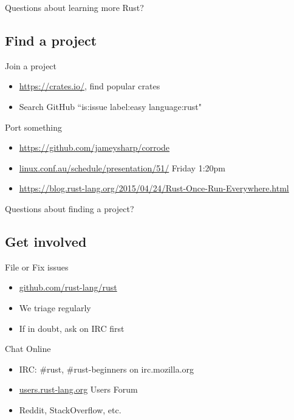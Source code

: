 \documentclass[aspectratio=169]{beamer}
\begin{document}
\begin{frame}
    \hfill Questions about learning more Rust?
\end{frame}


\subsection{Find a project}

\begin{frame}
    Join a project
    \begin{itemize}
        \item \url{https://crates.io/}, find popular crates
        \item Search GitHub ``is:issue label:easy language:rust"
    \end{itemize}
\end{frame}

\begin{frame}
    Port something
    \begin{itemize}
        \item \url{https://github.com/jameysharp/corrode}
        \item \url{linux.conf.au/schedule/presentation/51/} Friday 1:20pm
        \item \url{https://blog.rust-lang.org/2015/04/24/Rust-Once-Run-Everywhere.html}
    \end{itemize}
\end{frame}

\begin{frame}
    \hfill Questions about finding a project?
\end{frame}

\subsection{Get involved}

\begin{frame}
    File or Fix issues
    \begin{itemize}
        \item \url{github.com/rust-lang/rust}
        \item We triage regularly
        \item If in doubt, ask on IRC first
    \end{itemize}
\end{frame}

\begin{frame}
    Chat Online
    \begin{itemize}
        \item IRC: \#rust, \#rust-beginners on irc.mozilla.org
        \item \url{users.rust-lang.org} Users Forum
        \item Reddit, StackOverflow, etc.
    \end{itemize}
\end{frame}
\end{document}
